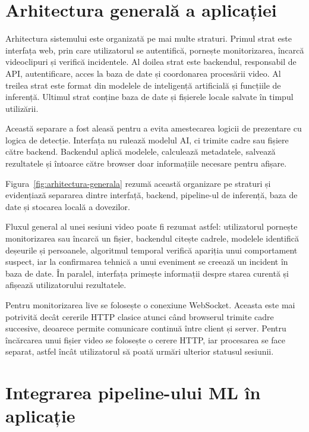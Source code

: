\section{Arhitectura generală a aplicației}

Arhitectura sistemului este organizată pe mai multe straturi. Primul strat este interfața web, prin care utilizatorul se autentifică, pornește monitorizarea, încarcă videoclipuri și verifică incidentele. Al doilea strat este backendul, responsabil de API, autentificare, acces la baza de date și coordonarea procesării video. Al treilea strat este format din modelele de inteligență artificială și funcțiile de inferență. Ultimul strat conține baza de date și fișierele locale salvate în timpul utilizării.

Această separare a fost aleasă pentru a evita amestecarea logicii de prezentare cu logica de detecție. Interfața nu rulează modelul AI, ci trimite cadre sau fișiere către backend. Backendul aplică modelele, calculează metadatele, salvează rezultatele și întoarce către browser doar informațiile necesare pentru afișare.

Figura~\ref{fig:arhitectura-generala} rezumă această organizare pe straturi și evidențiază separarea dintre interfață, backend, pipeline-ul de inferență, baza de date și stocarea locală a dovezilor.



Fluxul general al unei sesiuni video poate fi rezumat astfel: utilizatorul pornește monitorizarea sau încarcă un fișier, backendul citește cadrele, modelele identifică deșeurile și persoanele, algoritmul temporal verifică apariția unui comportament suspect, iar la confirmarea tehnică a unui eveniment se creează un incident în baza de date. În paralel, interfața primește informații despre starea curentă și afișează utilizatorului rezultatele.

Pentru monitorizarea live se folosește o conexiune WebSocket. Aceasta este mai potrivită decât cererile HTTP clasice atunci când browserul trimite cadre succesive, deoarece permite comunicare continuă între client și server. Pentru încărcarea unui fișier video se folosește o cerere HTTP, iar procesarea se face separat, astfel încât utilizatorul să poată urmări ulterior statusul sesiunii.

\section{Integrarea pipeline-ului ML în aplicație}

